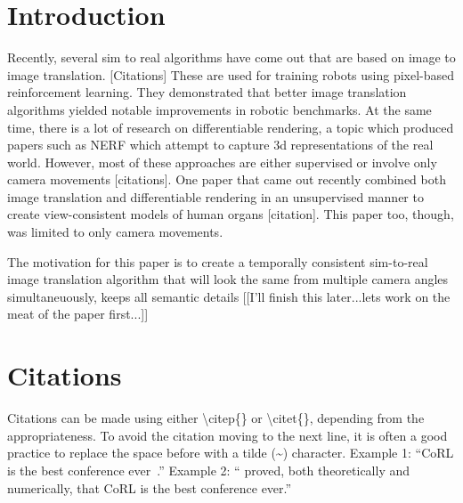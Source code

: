 \documentclass{article}
\begin{document}
\section{Introduction}
	
	Recently, several sim to real algorithms have come out that are based on image to image translation. [Citations]
	These are used for training robots using pixel-based reinforcement learning.
	They demonstrated that better image translation algorithms yielded notable improvements in robotic benchmarks.
	At the same time, there is a lot of research on differentiable rendering,
		a topic which produced papers such as NERF which attempt to capture 3d representations of the real world.
	However, most of these approaches are either supervised or involve only camera movements [citations].
	One paper that came out recently combined both image translation and differentiable rendering in an unsupervised manner to create view-consistent models of human organs [citation].
	This paper too, though, was limited to only camera movements.
	
	The motivation for this paper is to create a temporally consistent sim-to-real image translation algorithm that will look the same from multiple camera angles simultaneuously, keeps all semantic details 
	[[I'll finish this later...lets work on the meat of the paper first...]]
	



\section{Citations}
\label{sec:citations}

	Citations can be made using either \textbackslash citep\{\} or \textbackslash citet\{\}, depending from the appropriateness. To avoid the citation moving to the next line, it is often a good practice to replace the space before with a tilde (\~{}) character.
	Example 1: ``CoRL is the best conference ever~\citep{Gauss1857}.''
	Example 2: ``\citet{Gauss1857} proved, both theoretically and numerically, that CoRL is the best conference ever.''
	





\clearpage


\end{document}
